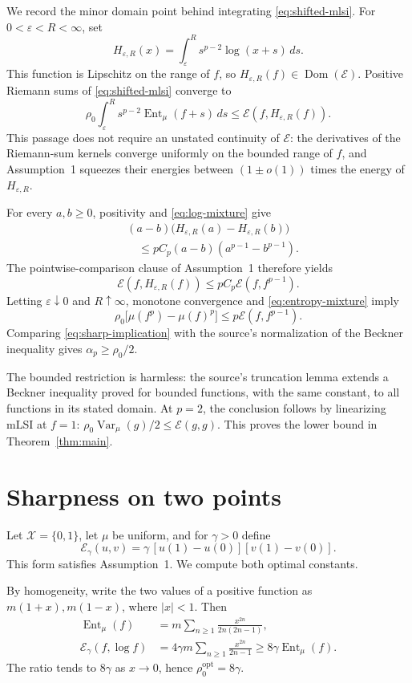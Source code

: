 \documentclass[11pt]{article}
\newcommand{\E}{\mathcal E}
\newcommand{\Ent}{\operatorname{Ent}}
\begin{document}
We record the minor domain point behind integrating \eqref{eq:shifted-mlsi}.
For $0<\varepsilon<R<\infty$, set
\[
 H_{\varepsilon,R}(x)=\int_\varepsilon^R
 s^{p-2}\log(x+s)\,ds.
\]
This function is Lipschitz on the range of $f$, so
$H_{\varepsilon,R}(f)\in\operatorname{Dom}(\E)$. Positive Riemann sums of
\eqref{eq:shifted-mlsi} converge to
\[
 \rho_0\int_\varepsilon^R s^{p-2}\Ent_\mu(f+s)\,ds
 \leq \E(f,H_{\varepsilon,R}(f)).
\]
This passage does not require an unstated continuity of $\E$: the derivatives
of the Riemann-sum kernels converge uniformly on the bounded range of $f$,
and Assumption~1 squeezes their energies between $(1\pm o(1))$ times the
energy of $H_{\varepsilon,R}$.

For every $a,b\geq0$, positivity and \eqref{eq:log-mixture} give
\begin{align*}
 &(a-b)\bigl(H_{\varepsilon,R}(a)-H_{\varepsilon,R}(b)\bigr)\\
 &\quad\leq pC_p(a-b)(a^{p-1}-b^{p-1}).
\end{align*}
The pointwise-comparison clause of Assumption~1 therefore yields
\[
 \E(f,H_{\varepsilon,R}(f))
 \leq pC_p\E(f,f^{p-1}).
\]
Letting $\varepsilon\downarrow0$ and $R\uparrow\infty$, monotone convergence
and \eqref{eq:entropy-mixture} imply
\begin{equation}\label{eq:sharp-implication}
 \rho_0\bigl[\mu(f^p)-\mu(f)^p\bigr]
 \leq p\E(f,f^{p-1}).
\end{equation}
Comparing \eqref{eq:sharp-implication} with the source's normalization of the
Beckner inequality gives $\alpha_p\geq\rho_0/2$.

The bounded restriction is harmless: the source's truncation lemma extends a
Beckner inequality proved for bounded functions, with the same constant, to
all functions in its stated domain. At $p=2$, the conclusion follows by
linearizing mLSI at $f=1$: $\rho_0\operatorname{Var}_\mu(g)/2\leq\E(g,g)$.
This proves the lower bound in Theorem~\ref{thm:main}.

\section{Sharpness on two points}

Let $\mathcal X=\{0,1\}$, let $\mu$ be uniform, and for $\gamma>0$ define
\[
 \E_\gamma(u,v)=\gamma\,[u(1)-u(0)][v(1)-v(0)].
\]
This form satisfies Assumption~1. We compute both optimal constants.

By homogeneity, write the two values of a positive function as
$m(1+x),m(1-x)$, where $|x|<1$. Then
\begin{align*}
 \Ent_\mu(f)
 &=m\sum_{n\geq1}\frac{x^{2n}}{2n(2n-1)},\\
 \E_\gamma(f,\log f)
 &=4\gamma m\sum_{n\geq1}\frac{x^{2n}}{2n-1}
 \geq 8\gamma\Ent_\mu(f).
\end{align*}
The ratio tends to $8\gamma$ as $x\to0$, hence
$\rho_0^{\mathrm{opt}}=8\gamma$.
\end{document}
